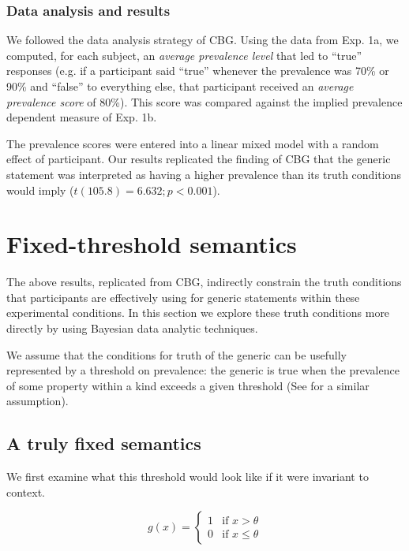 \documentclass[10pt,letterpaper]{article}
\begin{document}
\subsubsection{Data analysis and results}

%
We followed the data analysis strategy of CBG. Using the data from Exp. 1a, we computed, for each subject, an \emph{average prevalence level} that led to ``true'' responses (e.g. if a participant said ``true'' whenever the prevalence was 70\% or 90\% and ``false'' to everything else, that participant received an \emph{average prevalence score} of 80\%). This score was compared against the implied prevalence dependent measure of Exp. 1b. 

The prevalence scores were entered into a linear mixed model with a random effect of participant. Our results replicated the finding of CBG that the generic statement was interpreted as having a higher prevalence than its truth conditions would imply ($t(105.8) = 6.632; p < 0.001$). 

\section{Fixed-threshold semantics}
The above results, replicated from CBG, indirectly constrain the truth conditions that participants are effectively using for generic statements within these experimental conditions. In this section we explore these truth conditions more directly by using Bayesian data analytic techniques.

We assume that the conditions for truth of the generic can be usefully represented by a threshold on prevalence: the generic is true when the prevalence of some property within a kind exceeds a given threshold (See  for a similar assumption).


\subsection{A truly fixed semantics}
We first examine what this threshold would look like if it were invariant to context. 

\[
 g(x) =
  \begin{cases}
   1 & \text{if } x > \theta \\
   0       & \text{if } x \leq \theta
  \end{cases}
\]
\end{document}
